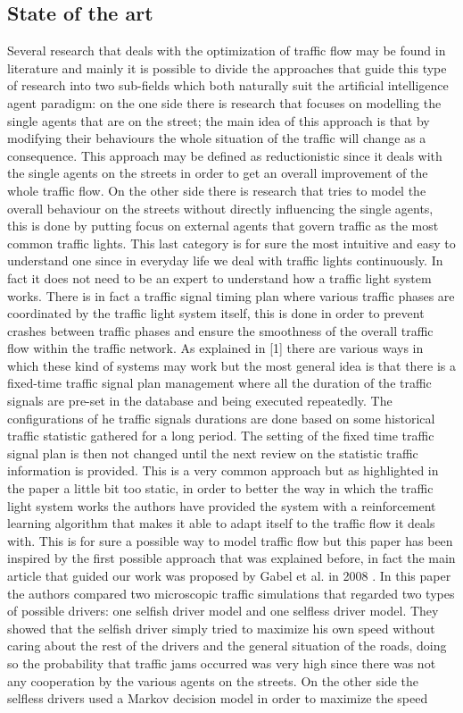 \documentclass[a4paper,hidelinks]{article}
\begin{document}
\subsection{State of the art}
Several research that deals with the optimization of traffic flow may be found in literature and mainly it is possible to divide the approaches that guide this type of research into two sub-fields which both naturally suit the artificial intelligence agent paradigm: on the one side there is research that focuses on modelling the single agents that are on the street; the main idea of this approach is that by modifying their behaviours the whole situation of the traffic will change as a consequence. This approach may be defined as reductionistic since it deals with the single agents on the streets in order to get an overall improvement of the whole traffic flow. On the other side there is research that tries to model the overall behaviour on the streets without directly influencing the single agents, this is done by putting focus on external agents that govern traffic as the most common traffic lights. This last category is for sure the most intuitive and easy to understand one since in everyday life we deal with traffic lights continuously. In fact it does not need to be an expert to understand how a traffic light system works. There is in fact a traffic signal timing plan where various traffic phases are coordinated by the traffic light system itself, this is done in order to prevent crashes between traffic phases and ensure the smoothness of the overall traffic flow within the traffic network. As explained in [1] there are various ways in which these kind of systems may work but the most general idea is that there is a fixed-time traffic signal plan management where all the duration of the traffic signals are pre-set in the database and being executed repeatedly. The configurations of he traffic signals durations are done based on some historical traffic statistic gathered for a long period. The setting of the fixed time traffic signal plan is then not changed until the next review on the statistic traffic information is provided. This is a very common approach but as highlighted in the paper a little bit too static, in order to better the way in which the traffic light system works the authors have provided the system with a reinforcement learning algorithm that makes it able to adapt itself to the traffic flow it deals with. This is for sure a possible way to model traffic flow but this paper has been inspired by the first possible approach that was explained before, in fact the main article that guided our work was proposed by Gabel et al. in 2008 \cite{gabel2012cooperative}. In this paper the authors compared two microscopic traffic simulations that regarded two types of possible drivers: one selfish driver model and one selfless driver model. They showed that the selfish driver simply tried to maximize his own speed without caring about the rest of the drivers and the general situation of the roads, doing so the probability that traffic jams occurred was very high since there was not any cooperation by the various agents on the streets. On the other side the selfless drivers used a Markov decision model in order to maximize the speed 
\end{document}
